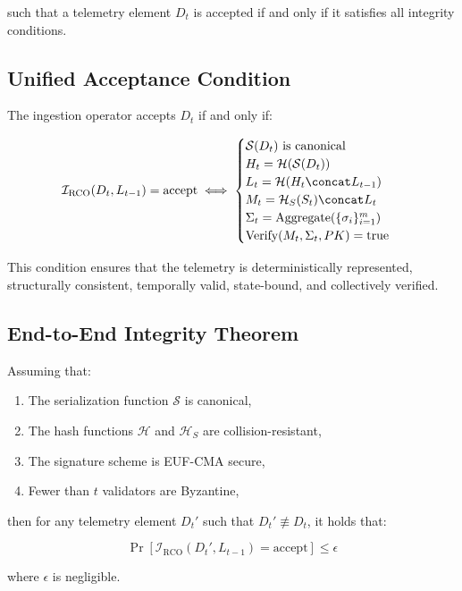 such that a telemetry element $D_t$ is accepted if and only if it satisfies all integrity conditions.

\subsection{Unified Acceptance Condition}

The ingestion operator accepts $D_t$ if and only if:

\begin{equation}
\mathcal{I}_{\text{RCO}}(D_t, L_{t-1}) = \text{accept} \iff
\begin{cases}
\mathcal{S}(D_t) \text{ is canonical} \\
H_t = \mathcal{H}(\mathcal{S}(D_t)) \\
L_t = \mathcal{H}(H_t \concat L_{t-1}) \\
M_t = \mathcal{H}_S(S_t) \concat L_t \\
\Sigma_t = \text{Aggregate}(\{\sigma_i\}_{i=1}^{m}) \\
\text{Verify}(M_t, \Sigma_t, PK) = \text{true}
\end{cases}
\end{equation}

This condition ensures that the telemetry is deterministically represented, structurally consistent, temporally valid, state-bound, and collectively verified.

\subsection{End-to-End Integrity Theorem}

\begin{theorem}
Assuming that:
\begin{enumerate}
\item The serialization function $\mathcal{S}$ is canonical,
\item The hash functions $\mathcal{H}$ and $\mathcal{H}_S$ are collision-resistant,
\item The signature scheme is EUF-CMA secure,
\item Fewer than $t$ validators are Byzantine,
\end{enumerate}
then for any telemetry element $D_t'$ such that $D_t' \not\equiv D_t$, it holds that:

\[
\Pr[\mathcal{I}_{\text{RCO}}(D_t', L_{t-1}) = \text{accept}] \leq \epsilon
\]

where $\epsilon$ is negligible.
\end{theorem}

